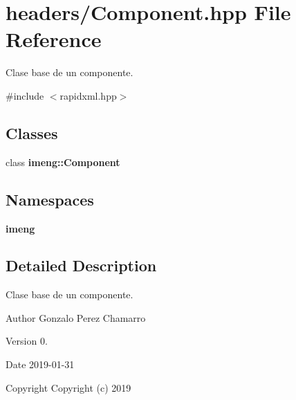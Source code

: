 \section{headers/\+Component.hpp File Reference}
\label{_component_8hpp}


Clase base de un componente.  


{\ttfamily \#include $<$rapidxml.\+hpp$>$}\newline
\subsection*{Classes}
\begin{DoxyCompactItemize}
\item 
class \textbf{ imeng\+::\+Component}
\end{DoxyCompactItemize}
\subsection*{Namespaces}
\begin{DoxyCompactItemize}
\item 
 \textbf{ imeng}
\end{DoxyCompactItemize}


\subsection{Detailed Description}
Clase base de un componente. 

\begin{DoxyAuthor}{Author}
Gonzalo Perez Chamarro 
\end{DoxyAuthor}
\begin{DoxyVersion}{Version}
0. 
\end{DoxyVersion}
\begin{DoxyDate}{Date}
2019-\/01-\/31
\end{DoxyDate}
\begin{DoxyCopyright}{Copyright}
Copyright (c) 2019 
\end{DoxyCopyright}
